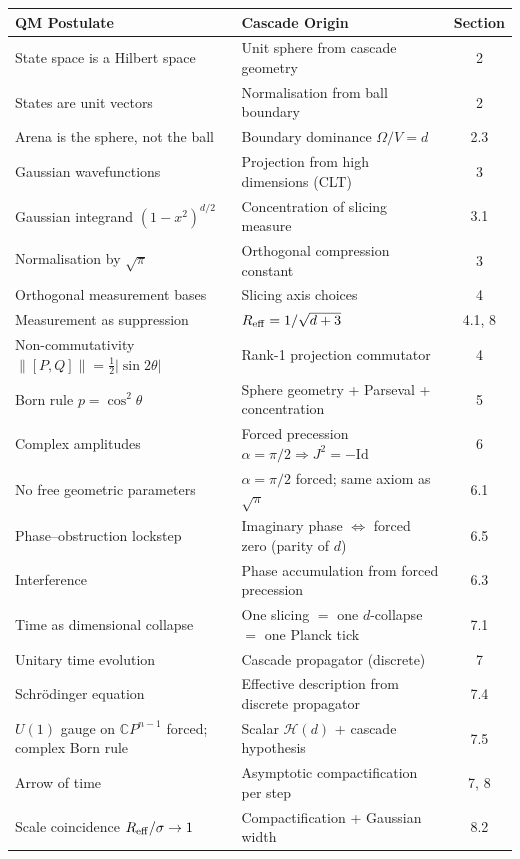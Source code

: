 \documentclass[12pt,a4paper]{article}
\begin{document}
\begin{center}
\small
\begin{tabular}{>{\raggedright\arraybackslash}p{6cm}>{\raggedright\arraybackslash}p{6.5cm}c}
\toprule
QM Postulate & Cascade Origin & Section \\
\midrule
State space is a Hilbert space & Unit sphere from cascade geometry & 2 \\
States are unit vectors & Normalisation from ball boundary & 2 \\
Arena is the sphere, not the ball & Boundary dominance $\Omega/V=d$ & 2.3 \\
Gaussian wavefunctions & Projection from high dimensions (CLT) & 3 \\
Gaussian integrand $(1-x^2)^{d/2}$ & Concentration of slicing measure & 3.1 \\
Normalisation by $\sqrt{\pi}$ & Orthogonal compression constant & 3 \\
Orthogonal measurement bases & Slicing axis choices & 4 \\
Measurement as suppression & $R_{\rm eff}=1/\sqrt{d+3}$ & 4.1, 8 \\
Non-commutativity $\|[P,Q]\|=\tfrac{1}{2}|\sin 2\theta|$ & Rank-1 projection commutator & 4 \\
Born rule $p = \cos^2\theta$ & Sphere geometry + Parseval + concentration & 5 \\
Complex amplitudes & Forced precession $\alpha=\pi/2\Rightarrow J^2=-\mathrm{Id}$ & 6 \\
No free geometric parameters & $\alpha=\pi/2$ forced; same axiom as $\sqrt{\pi}$ & 6.1 \\
Phase--obstruction lockstep & Imaginary phase $\Leftrightarrow$ forced zero (parity of $d$) & 6.5 \\
Interference & Phase accumulation from forced precession & 6.3 \\
Time as dimensional collapse & One slicing $=$ one $d$-collapse $=$ one Planck tick & 7.1 \\
Unitary time evolution & Cascade propagator (discrete) & 7 \\
Schr\"{o}dinger equation & Effective description from discrete propagator & 7.4 \\
$U(1)$ gauge on $\mathbb{C}P^{n-1}$ forced; complex Born rule & Scalar $\mathcal{H}(d)$ + cascade hypothesis & 7.5 \\
Arrow of time & Asymptotic compactification per step & 7, 8 \\
Scale coincidence $R_{\rm eff}/\sigma\to 1$ & Compactification + Gaussian width & 8.2 \\

\end{tabular}
\end{center}
\end{document}
